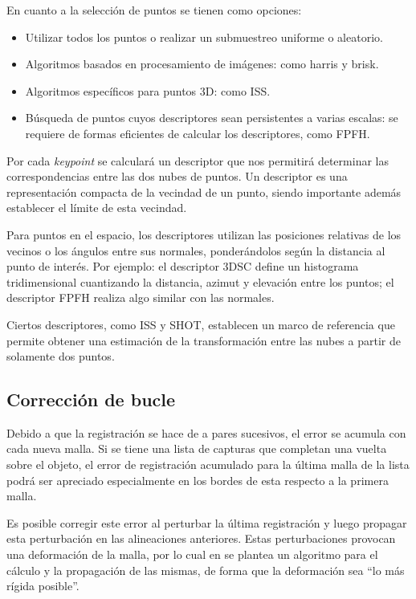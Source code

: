 		En cuanto a la selección de puntos se tienen como opciones:
		\begin{itemize}
			\item Utilizar todos los puntos o realizar un submuestreo uniforme o aleatorio.
			\item Algoritmos basados en procesamiento de imágenes: como harris\cite{Harris88acombined} y brisk\cite{Leutenegger:2011:BBR:2355573.2356277}.
			\item Algoritmos específicos para puntos 3D: como ISS\cite{ISS}.
			\item Búsqueda de puntos cuyos descriptores sean persistentes a varias escalas: se requiere de formas eficientes de calcular los descriptores, como FPFH\cite{Rusu:2009:FPF:1703435.1703733}.
		\end{itemize}

			Por cada \emph{keypoint} se calculará un descriptor que nos
			permitirá determinar las correspondencias entre las dos nubes de
			puntos.
			Un descriptor es una representación compacta
			de la vecindad de un punto,
			siendo importante además establecer el límite de esta vecindad.

			Para puntos en el espacio, los descriptores utilizan las
			posiciones relativas de los vecinos o los ángulos entre sus
			normales, ponderándolos según la distancia al punto de interés.
			Por ejemplo: el descriptor 3DSC define un histograma tridimensional
			cuantizando la distancia, azimut y elevación entre los puntos;
			el descriptor FPFH realiza algo similar con las normales.

			Ciertos descriptores, como ISS y SHOT, establecen un marco de
			referencia que permite obtener una estimación de la transformación
			entre las nubes a partir de solamente dos puntos.

		\subsection{Corrección de bucle}
			Debido a que la registración se hace de a pares sucesivos, el error
			se acumula con cada nueva malla.  Si se tiene una lista de capturas
			que completan una vuelta sobre el objeto, el error de registración
			acumulado para la última malla de la lista podrá ser apreciado
			especialmente en los bordes de esta respecto a la primera malla.

			Es posible corregir este error al perturbar la última registración
			y luego propagar esta perturbación en las alineaciones anteriores.
			Estas perturbaciones provocan una deformación de la malla, por lo
			cual
			en \cite{5457479}
			se plantea un algoritmo para el cálculo y la propagación de las
			mismas, de forma que la deformación sea ``lo más rígida posible''.

